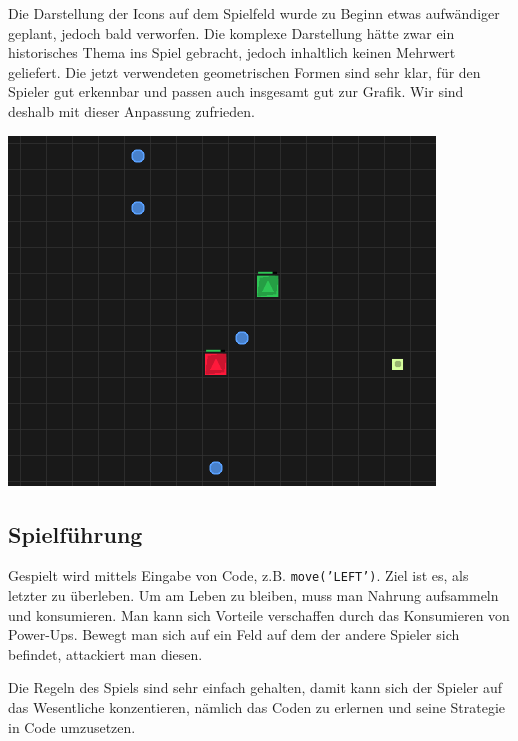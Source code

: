 \documentclass[11pt,a4paper,titlepage]{article}
\begin{document}
Die Darstellung der Icons auf dem Spielfeld wurde zu Beginn etwas aufwändiger geplant, jedoch bald verworfen. Die komplexe Darstellung hätte zwar ein historisches Thema ins Spiel gebracht, jedoch inhaltlich keinen Mehrwert geliefert. Die jetzt verwendeten geometrischen Formen sind sehr klar, für den Spieler gut erkennbar und passen auch insgesamt gut zur Grafik. Wir sind deshalb mit dieser Anpassung zufrieden.

\includegraphics[width=\textwidth]{game1.png}

\subsection{Spielführung}

Gespielt wird mittels Eingabe von Code, z.B. \texttt{move('LEFT')}. Ziel ist es, als letzter zu überleben. Um am Leben zu bleiben, muss man Nahrung aufsammeln und konsumieren. Man kann sich Vorteile verschaffen durch das Konsumieren von Power-Ups. Bewegt man sich auf ein Feld auf dem der andere Spieler sich befindet, attackiert man diesen.

Die Regeln des Spiels sind sehr einfach gehalten, damit kann sich der Spieler auf das Wesentliche konzentieren, nämlich das Coden zu erlernen und seine Strategie in Code umzusetzen.
\end{document}
